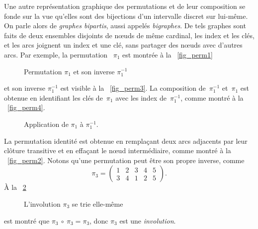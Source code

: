 Une autre représentation graphique des permutations et de leur
composition se fonde sur la vue
qu'elles sont des bijections d'un intervalle discret sur lui-même. On
parle alors de \emph{graphes bipartis}, aussi appelés
\emph{bigraphes}. De tels
graphes sont faits de deux ensembles disjoints de n{\oe}uds de même
cardinal, les index et les clés, et les arcs joignent un index et une
clé, sans partager des n{\oe}uds avec d'autres arcs. Par exemple, la
permutation ~\(\pi_1\) est montrée à la \fig~\vref{fig_perm1}
\begin{figure}
\centering
{}
\qquad\qquad
{}
\caption{Permutation \(\pi_1\) et son inverse \(\pi_1^{-1}\)
\label{fig_pi_1}}
\end{figure}
et son inverse \(\pi_1^{-1}\) est visible à la
\fig~\vref{fig_perm3}. La composition
de~\(\pi_1^{-1}\) et~\(\pi_1\) est obtenue en identifiant les clés
de~\(\pi_1\) avec les index de~\(\pi_1^{-1}\), comme montré à la
\fig~\vref{fig_perm4}.
\begin{figure}[t]
\centering
{}%
\qquad\qquad
{}
\caption{Application de \(\pi_1\) à \(\pi_1^{-1}\).}
\end{figure}
La permutation identité est obtenue en
remplaçant deux arcs adjacents par leur clôture transitive
 et en effaçant le n{\oe}ud intermédiaire,
comme montré à la \fig~\vref{fig_perm2}. Notons qu'une permutation
peut être son propre inverse, comme
\begin{equation*}
\pi_3 =
\begin{pmatrix}
1 & 2 & 3 & 4 & 5\\
3 & 4 & 1 & 2 & 5
\end{pmatrix}.
\end{equation*}
À la \fig~\ref{fig_involution}
\begin{figure}
\centering
{}
\qquad\qquad
{}
\caption{L'involution \(\pi_3\) se trie elle-même\label{fig_involution}}
\end{figure}
est montré que \(\pi_3~\circ~\pi_3 = \pi_3\), donc \(\pi_3\) est une
\emph{involution}.

